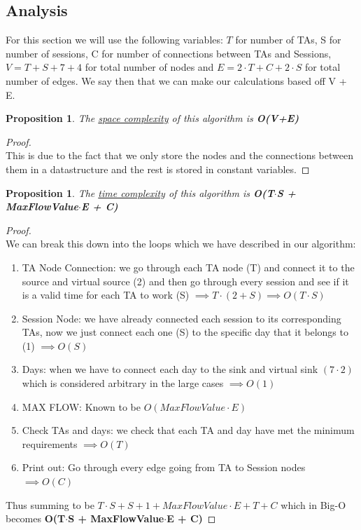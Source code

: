 \documentclass[12pt]{article}
\newtheorem{proposition}[theorem]{Proposition}
\begin{document}
\subsection{Analysis}
For this section we will use the following variables: $T$ for number of TAs, S for number of
sessions, C for number of connections between TAs and Sessions, $V = T + S + 7 + 4$ for total
number of nodes and $E = 2\cdot T + C + 2\cdot S$ for total number of edges. We say then that
we can make our calculations based off V + E.

\begin{proposition}
\label{numq}
The \underline{space complexity} of this algorithm is \textbf{O(V+E)}
\end{proposition}

\begin{proof}
~ \\ \indent This is due to the fact that we only store the nodes and the connections between
them in a datastructure and the rest is stored in constant variables.
\end{proof}

\begin{proposition}
\label{numq}
The \underline{time complexity} of this algorithm is \textbf{O(T$\cdot$S + MaxFlowValue$\cdot$E + C)}
\end{proposition}

\begin{proof}
~ \\ \indent We can break this down into the loops which we have described in our algorithm:
\begin{enumerate}
    \item TA Node Connection: we go through each TA node (T) and connect it to the source and
        virtual source (2) and then go through every session and see if it is a valid time
        for each TA to work (S) $\implies T\cdot (2+S) \implies O(T\cdot S)$
    \item Session Node: we have already connected each session to its corresponding TAs, now
        we just connect each one (S) to the specific day that it belongs to (1) $\implies O(S)$
    \item Days: when we have to connect each day to the sink and virtual sink $(7\cdot 2)$ which
        is considered arbitrary in the large cases $\implies O(1)$
    \item MAX FLOW: Known to be $O(MaxFlowValue\cdot E)$
    \item Check TAs and days: we check that each TA and day have met the minimum requirements
        $\implies O(T)$
    \item Print out: Go through every edge going from TA to Session nodes $\implies O(C)$
\end{enumerate}
Thus summing to be $T\cdot S + S + 1 + MaxFlowValue\cdot E + T + C$ which in Big-O becomes
\textbf{O(T$\cdot$S + MaxFlowValue$\cdot$E + C)}
\end{proof}
\end{document}
